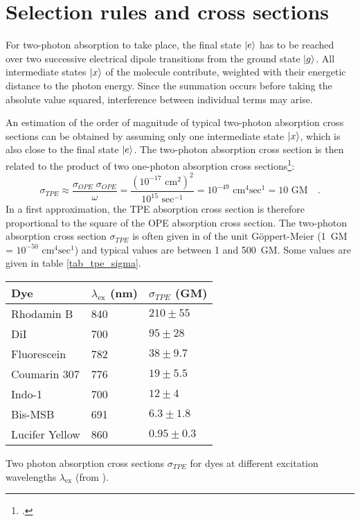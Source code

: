 \section{Selection rules and cross sections}

For two-photon absorption to take place, the
final state $\ket{e}$ has to be reached  over two successive electrical
dipole transitions from the ground state  $\ket{g}$.  
All intermediate states  $\ket{x}$ of the molecule contribute, weighted  with their energetic
distance to the photon energy.
Since the summation occurs before taking the absolute value squared, interference between individual terms may arise.





An estimation of the order of magnitude of typical
two-photon absorption cross sections can
be obtained by 
assuming only one   intermediate state $\ket{x}$, which is also close to the
final state $\ket{e}$. The two-photon absorption cross section is then related to the product of two one-photon absorption cross sections\footcite{xu97}:
\begin{equation}
\sigma_{TPE} \approx \frac{\sigma_{OPE} \; \sigma_{OPE}}{ \omega}
= \frac{(10^{-17} \text{ cm}^2)^2}{10^{15} \text{ sec}^{-1}} =
10^{-49}\text{ cm}^4\text{sec}^{1} = 10\text{ GM} \quad .
\end{equation}
In a first approximation, the TPE absorption cross section is therefore
proportional to the square of the OPE absorption cross section. The
two-photon absorption cross section $\sigma_{TPE}$ is often given in
of the unit Göppert-Meier (1~GM =
$10^{-50}\text{ cm}^4\text{sec}^{1}$) and typical values are
between 1 and 500~GM. 
Some  values are given  in
table \ref{tab_tpe_sigma}.



\begin{margintable} \renewcommand{\arraystretch}{1.1}
\begin{tabular}{lll}
 Dye & $\lambda_{\text{ex}}$ (nm) & $\sigma_{TPE}$ (GM) \\
\hline Rhodamin B & 840    & $210 \pm 55$ \\
DiI      & 700    & $95 \pm 28$   \\
Fluorescein & 782  &  $38 \pm 9.7$ \\
Coumarin 307 & 776  &  $19 \pm 5.5$   \\
Indo-1   & 700    &  $12 \pm 4$ \\
Bis-MSB & 691    & $6.3 \pm 1.8$ \\
Lucifer Yellow & 860  &  $0.95 \pm 0.3$   \\ 
\end{tabular}
\caption{Two photon absorption cross sections $\sigma_{TPE}$
for dyes at different excitation wavelengths
$\lambda_{\text{ex}}$ (from \cite{xu96mar}). } \label{tab_tpe_sigma}
\end{margintable}


